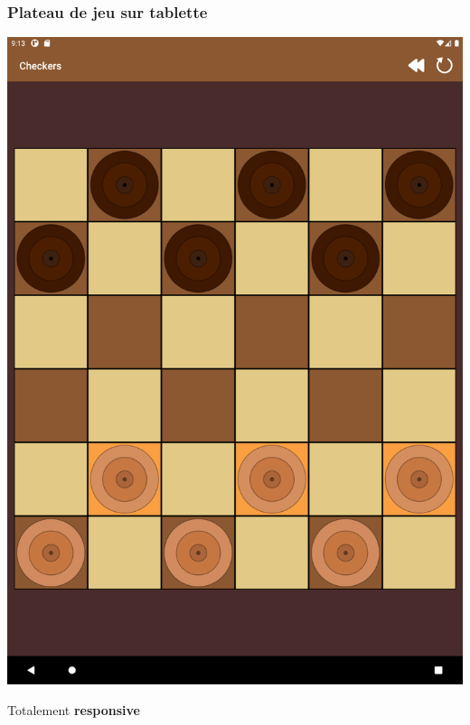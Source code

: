 \documentclass{beamer}
\begin{document}
\begin{frame}
  \frametitle{Plateau de jeu sur tablette}
  \begin{center}
    \includegraphics[scale=0.06]{screen_tablet.png}
  \end{center}
  
  \begin{center}
    Totalement \textbf{responsive}
  \end{center}
\end{frame}
\end{document}
